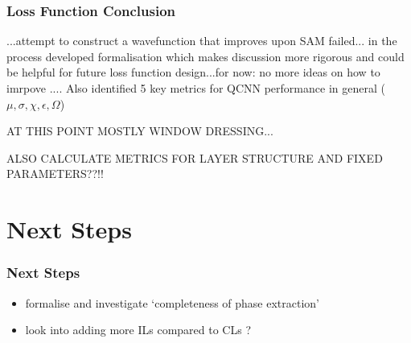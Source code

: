 \documentclass{beamer}
\begin{document}
\begin{frame}
\frametitle{Loss Function Conclusion}
...attempt to construct a wavefunction that improves upon SAM failed...
in the process developed formalisation which makes discussion more rigorous and could be helpful for future loss function design...for now: no more ideas on how to imrpove ....
Also identified 5 key metrics for QCNN performance in general ($\mu, \sigma, \chi, \epsilon, \Omega$)


AT THIS POINT MOSTLY WINDOW DRESSING... 

ALSO CALCULATE METRICS FOR LAYER STRUCTURE AND FIXED PARAMETERS??!!
\end{frame}


\section{Next Steps}

\begin{frame}
\frametitle{Next Steps}
\begin{itemize}
\item formalise and investigate `completeness of phase extraction' 
\item look into adding more ILs compared to CLs ?
\end{itemize}
\end{frame}
\end{document}
